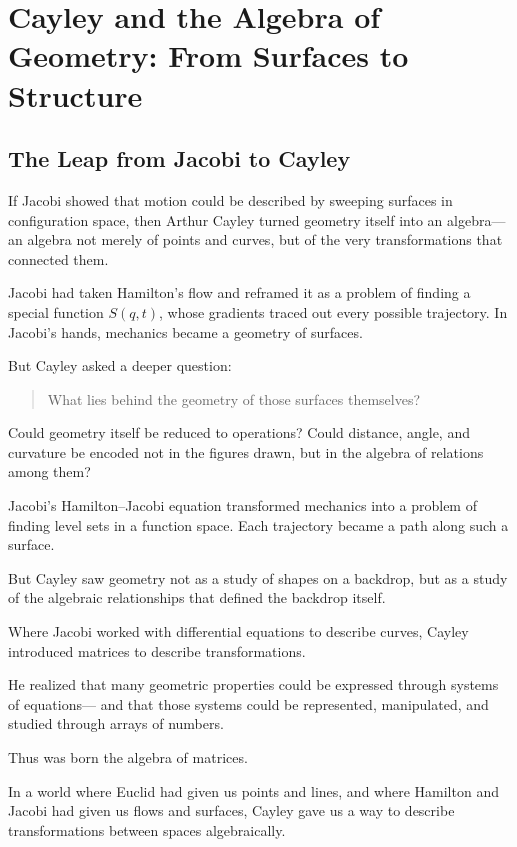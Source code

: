 \section{Cayley and the Algebra of Geometry: From Surfaces to Structure}

\subsection{The Leap from Jacobi to Cayley}

If Jacobi showed that motion could be described by sweeping surfaces in configuration space,  
then Arthur Cayley turned geometry itself into an algebra—  
an algebra not merely of points and curves, but of the very transformations that connected them.

Jacobi had taken Hamilton’s flow and reframed it as a problem of finding a special function \( S(q,t) \),  
whose gradients traced out every possible trajectory.  
In Jacobi’s hands, mechanics became a geometry of surfaces.

But Cayley asked a deeper question:

\begin{quote}
What lies behind the geometry of those surfaces themselves?
\end{quote}

Could geometry itself be reduced to operations?  
Could distance, angle, and curvature be encoded not in the figures drawn, but in the algebra of relations among them?

Jacobi’s Hamilton–Jacobi equation transformed mechanics into a problem of finding level sets in a function space.  
Each trajectory became a path along such a surface.

But Cayley saw geometry not as a study of shapes on a backdrop,  
but as a study of the algebraic relationships that defined the backdrop itself.

Where Jacobi worked with differential equations to describe curves,  
Cayley introduced matrices to describe transformations.

He realized that many geometric properties could be expressed through systems of equations—  
and that those systems could be represented, manipulated, and studied through arrays of numbers.

Thus was born the algebra of matrices.


In a world where Euclid had given us points and lines,  
and where Hamilton and Jacobi had given us flows and surfaces,  
Cayley gave us a way to describe transformations between spaces algebraically.

